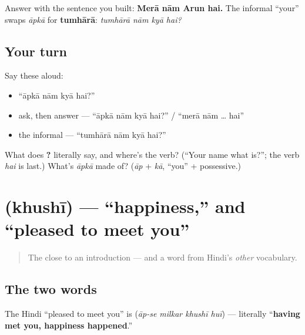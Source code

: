 \begin{grammarlens}[title={Grammar Lens: answer, and the informal version}]
Answer with the sentence you built: \textbf{Merā nām Arun hai.} The informal \textquotedblleft{}your\textquotedblright{} swaps \emph{āpkā} for \textbf{tumhārā}: \emph{tumhārā nām kyā hai?}
\end{grammarlens}

\subsection*{Your turn}
Say these aloud:

\begin{itemize}
\raggedright
  \item \textquotedblleft{}āpkā nām kyā hai?\textquotedblright{}
  \item ask, then answer — \textquotedblleft{}āpkā nām kyā hai?\textquotedblright{} / \textquotedblleft{}merā nām … hai\textquotedblright{}
  \item the informal — \textquotedblleft{}tumhārā nām kyā hai?\textquotedblright{}
\end{itemize}

\begin{tcolorbox}[breakable,colback=teal!4,colframe=teal!35!black,title={Before you move on}]
What does \textbf{   ?} literally say, and where's the verb? (\textquotedblleft{}Your name what is?\textquotedblright{}; the verb \emph{hai} is last.) What's \emph{āpkā} made of? (\emph{āp} + \emph{kā}, \textquotedblleft{}you\textquotedblright{} + possessive.)
\end{tcolorbox}
\section[\texorpdfstring{\hi{आपसे} \hi{मिलकर} \hi{ख़ुशी} \hi{हुई} … (āpse milkar …)}{आपसे मिलकर ख़ुशी हुई … (āpse milkar …)}]{ (khushī) — \textquotedblleft{}happiness,\textquotedblright{} and \textquotedblleft{}pleased to meet you\textquotedblright{}}

\label{lesson:HI-C02-khushi}



\begin{quote}
The close to an introduction — and a word from Hindi's \emph{other} vocabulary.
\end{quote}

\subsection*{The two words}
The Hindi \textquotedblleft{}pleased to meet you\textquotedblright{} is \textbf{   } (\emph{āp-se milkar khushī huī}) — literally \textquotedblleft{}\textbf{having met you, happiness happened}.\textquotedblright{}

